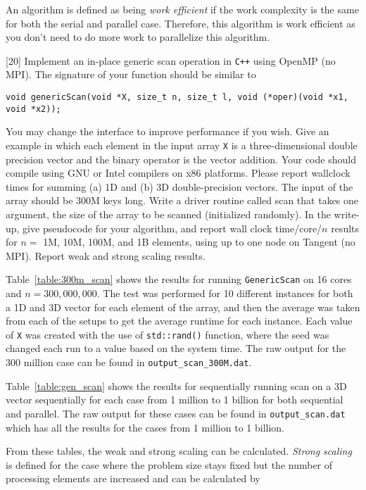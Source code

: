 \documentclass[addpoints]{exam}
\begin{document}
\begin{questions}
\begin{solution}
An algorithm is defined as being {\em work efficient} if the work complexity is the same for both the serial and parallel case. Therefore, this algorithm is work efficient as you don't need to do more work to parallelize this algorithm.
\end{solution}

\newpage

[20]
Implement an in-place generic scan operation in \verb~C++~ using OpenMP (no MPI). The signature of your function should be similar to

\verb~void genericScan(void *X, size_t n, size_t l, void (*oper)(void *x1, void *x2));~

You may change the interface to improve performance if you wish. Give an example in which each element in the input array \verb~X~ is a three-dimensional double precision vector and the binary operator is the vector addition. Your code should compile using GNU or Intel compilers on x86 platforms. Please report wallclock times for summing (a) 1D and (b) 3D double-precision vectors. The input of the array should be 300M keys long. Write a driver routine called scan that takes one argument, the size of the array to be scanned (initialized randomly). In the write-up, give pseudocode for your algorithm, and report wall clock time/core/$n$ results for $n =$ 1M, 10M, 100M, and 1B elements, using up to one node on Tangent (no MPI). Report weak and strong scaling results.

\begin{solution} 
Table~\ref{table:300m_scan} shows the results for running \verb~GenericScan~ on 16 cores and $n=300,000,000$. The test was performed for 10 different instances for both a 1D and 3D vector for each element of the array, and then the average was taken from each of the setups to get the average runtime for each instance. Each value of \verb~X~ was created with the use of \verb~std::rand()~ function, where the seed was changed each run to a value based on the system time. The raw output for the 300 million case can be found in {\tt output\_scan\_300M.dat}.

Table~\ref{table:gen_scan} shows the results for sequentially running scan on a 3D vector sequentially for each case from 1 million to 1 billion for both sequential and parallel. The raw output for these cases can be found in {\tt output\_scan.dat} which has all the results for the cases from 1 million to 1 billion.

From these tables, the weak and strong scaling can be calculated. {\em Strong scaling} is defined for the case where the problem size stays fixed but the number of processing elements are increased and can be calculated by


\end{solution}
\end{questions}
\end{document}

